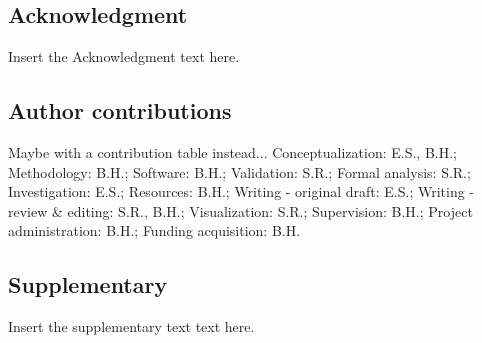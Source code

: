 \subsection{Acknowledgment}
Insert the Acknowledgment text here.

\subsection{Author contributions}
Maybe with a contribution table instead...
Conceptualization: E.S., B.H.; Methodology: B.H.; Software: B.H.; Validation: S.R.; Formal analysis: S.R.; Investigation: E.S.; Resources: B.H.; Writing - original draft: E.S.; Writing - review \& editing: S.R., B.H.; Visualization: S.R.; Supervision: B.H.; Project administration: B.H.; Funding acquisition: B.H.

\subsection{Supplementary}
Insert the supplementary text text here.